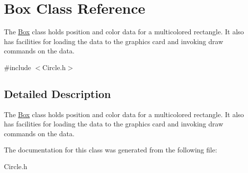 \hypertarget{class_box}{}\section{Box Class Reference}
\label{class_box}


The \hyperlink{class_box}{Box} class holds position and color data for a multicolored rectangle. It also has facilities for loading the data to the graphics card and invoking draw commands on the data.  




{\ttfamily \#include $<$Circle.\+h$>$}



\subsection{Detailed Description}
The \hyperlink{class_box}{Box} class holds position and color data for a multicolored rectangle. It also has facilities for loading the data to the graphics card and invoking draw commands on the data. 

The documentation for this class was generated from the following file\+:\begin{DoxyCompactItemize}
\item 
Circle.\+h\end{DoxyCompactItemize}
